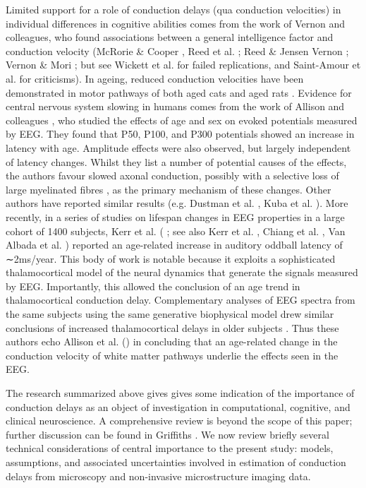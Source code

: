 Limited support for a role of conduction delays (qua conduction velocities) in individual differences in cognitive abilities comes from the work of Vernon and colleagues, who found associations between a general intelligence factor and conduction velocity (McRorie \& Cooper  \citeyear{mcrorie2004synaptic}, Reed et al. \citeyear{reed2004confirmation}; Reed \& Jensen \citeyear{reed1991arm,reed1992conduction,reed1993a}
Vernon \citeyear{vernon1983speed}; Vernon \& Mori \citeyear{vernon1992intelligence} ; but see Wickett et al. \citeyear{wickett1994peripheral} for failed replications, and Saint-Amour et al. \citeyear{saintamour2005can} for criticisms). In ageing, reduced conduction velocities have been demonstrated in motor pathways of both aged cats \citep{morales1987basic,xi1999changes} and aged rats \citep{astonjones1980brain}. Evidence for central nervous system slowing in humans comes from the work of Allison and colleagues \citep{allison1984developmental,allison1983brain}, who studied the effects of age and sex on evoked potentials measured by EEG. They found that P50, P100, and P300 potentials showed an increase in latency with age.  Amplitude effects were also observed, but largely independent of latency changes. Whilst they list a number of potential causes of the effects, the authors favour slowed axonal conduction, possibly with a selective loss of large myelinated fibres \cite{morrison1990aging}, as the primary mechanism of these changes. Other authors have reported similar results (e.g. Dustman et al. \citeyear{dustman1990age}, Kuba et al. \citeyear{kuba2012aging}). More recently, in a series of studies on lifespan changes in EEG properties in a large cohort of 1400 subjects, Kerr et al. (\citeyear{kerr2010age} 
; see also Kerr et al. \citeyear{kerr2011modelbased}, Chiang et al. \citeyear{chiang2011age}, Van Albada et al. \citeyear{vanalbada2010neurophysiological}) reported an age-related increase in auditory oddball latency of ∼2ms/year. This body of work is notable because it exploits a sophisticated thalamocortical model of the neural dynamics that generate the signals measured by EEG. Importantly, this allowed the conclusion of an age trend in thalamocortical conduction delay. Complementary analyses of EEG spectra from the same subjects using the same generative biophysical model drew similar conclusions of increased thalamocortical delays in older subjects \citep{vanalbada2010neurophysiological}. Thus these authors echo Allison et al.  (\citeyear{allison1984developmental}) in concluding that an age-related change in the conduction velocity of white matter pathways underlie the effects seen in the EEG. 

The research summarized above gives gives some indication of the importance of conduction delays as an object of investigation in computational, cognitive, and clinical neuroscience. A comprehensive review is beyond the scope of this paper; further discussion can be found in Griffiths \citeyear{griffiths2014the}. We now review briefly several technical considerations of central importance to the present study: models, assumptions, and associated uncertainties involved in estimation of conduction delays from microscopy and non-invasive microstructure imaging data. 

